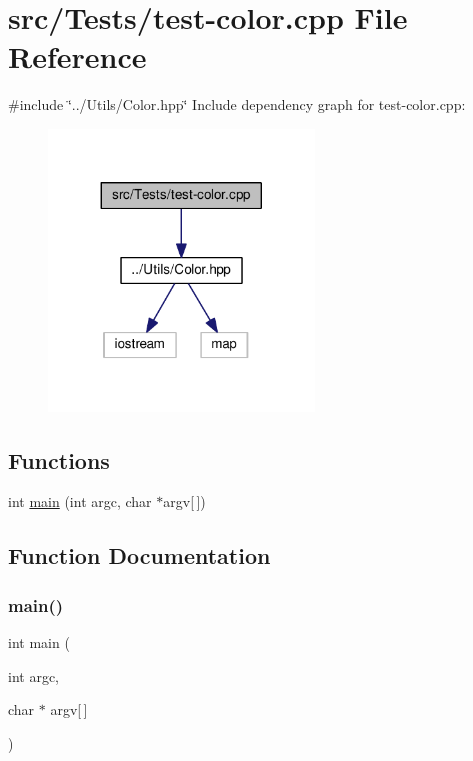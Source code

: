 \hypertarget{test-color_8cpp}{}\section{src/\+Tests/test-\/color.cpp File Reference}
\label{test-color_8cpp}
{\ttfamily \#include \char`\"{}../\+Utils/\+Color.\+hpp\char`\"{}}\newline
Include dependency graph for test-\/color.cpp\+:\nopagebreak
\begin{figure}[H]
\begin{center}
\leavevmode
\includegraphics[width=200pt]{test-color_8cpp__incl}
\end{center}
\end{figure}
\subsection*{Functions}
\begin{DoxyCompactItemize}
\item 
int \hyperlink{test-color_8cpp_a0ddf1224851353fc92bfbff6f499fa97}{main} (int argc, char $\ast$argv\mbox{[}$\,$\mbox{]})
\end{DoxyCompactItemize}


\subsection{Function Documentation}
\hypertarget{test-color_8cpp_a0ddf1224851353fc92bfbff6f499fa97}{}\label{test-color_8cpp_a0ddf1224851353fc92bfbff6f499fa97} 
\subsubsection{\texorpdfstring{main()}{main()}}
{\footnotesize\ttfamily int main (\begin{DoxyParamCaption}\item[{int}]{argc,  }\item[{char $\ast$}]{argv\mbox{[}$\,$\mbox{]} }\end{DoxyParamCaption})}

